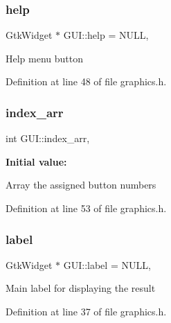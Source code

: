 \subsubsection{\texorpdfstring{help}{help}}
{\footnotesize\ttfamily Gtk\+Widget $\ast$ G\+U\+I\+::help = N\+U\+LL\hspace{0.3cm}{\ttfamily [static]}, {\ttfamily [protected]}}

Help menu button 

Definition at line 48 of file graphics.\+h.

\mbox{\label{class_g_u_i_a370dccd74ba9ec5b2b7f16ec17bed2bc}} 
\subsubsection{\texorpdfstring{index\_arr}{index\_arr}}
{\footnotesize\ttfamily int G\+U\+I\+::index\+\_\+arr\hspace{0.3cm}{\ttfamily [static]}, {\ttfamily [protected]}}

{\bfseries Initial value\+:}
\begin{DoxyCode}{0}

\end{DoxyCode}
Array the assigned button numbers 

Definition at line 53 of file graphics.\+h.

\mbox{\label{class_g_u_i_ad2408a0ec1775ce2d112157ccac24af8}} 
\subsubsection{\texorpdfstring{label}{label}}
{\footnotesize\ttfamily Gtk\+Widget $\ast$ G\+U\+I\+::label = N\+U\+LL\hspace{0.3cm}{\ttfamily [static]}, {\ttfamily [protected]}}

Main label for displaying the result 

Definition at line 37 of file graphics.\+h.

\mbox{\label{class_g_u_i_a4f2532f4151e5387f715efc462d8f24e}} 
